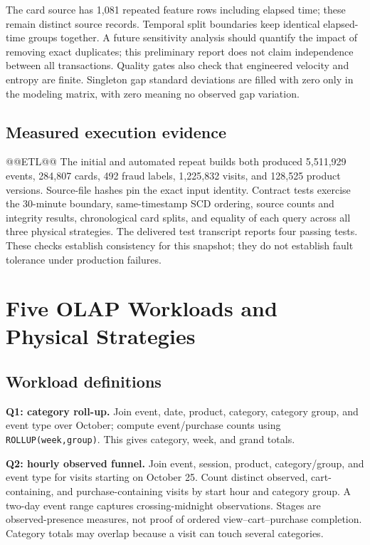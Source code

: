 \documentclass[conference]{IEEEtran}
\newcommand{\code}[1]{\texttt{\small #1}}
\begin{document}
The card source has 1,081 repeated feature rows including elapsed time; these remain distinct source records. Temporal split boundaries keep identical elapsed-time groups together. A future sensitivity analysis should quantify the impact of removing exact duplicates; this preliminary report does not claim independence between all transactions. Quality gates also check that engineered velocity and entropy are finite. Singleton gap standard deviations are filled with zero only in the modeling matrix, with zero meaning no observed gap variation.

\subsection{Measured execution evidence}
@@ETL@@
The initial and automated repeat builds both produced 5,511,929 events, 284,807 cards, 492 fraud labels, 1,225,832 visits, and 128,525 product versions. Source-file hashes pin the exact input identity. Contract tests exercise the 30-minute boundary, same-timestamp SCD ordering, source counts and integrity results, chronological card splits, and equality of each query across all three physical strategies. The delivered test transcript reports four passing tests. These checks establish consistency for this snapshot; they do not establish fault tolerance under production failures.

\section{Five OLAP Workloads and Physical Strategies}
\subsection{Workload definitions}
\textbf{Q1: category roll-up.} Join event, date, product, category, category group, and event type over October; compute event/purchase counts using \code{ROLLUP(week,group)}. This gives category, week, and grand totals.

\textbf{Q2: hourly observed funnel.} Join event, session, product, category/group, and event type for visits starting on October 25. Count distinct observed, cart-containing, and purchase-containing visits by start hour and category group. A two-day event range captures crossing-midnight observations. Stages are observed-presence measures, not proof of ordered view--cart--purchase completion. Category totals may overlap because a visit can touch several categories.
\end{document}
